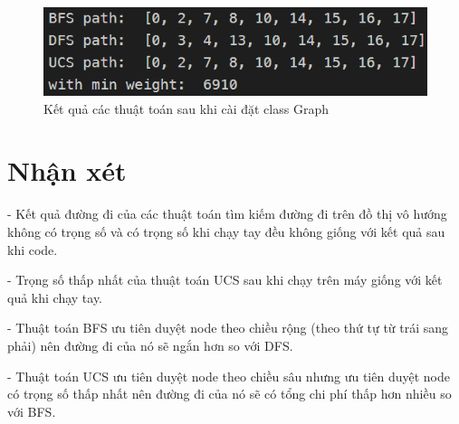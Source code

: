 \documentclass[a4paper, 11pt]{article}
\begin{document}
\begin{figure}[h]
    \centering
    \includegraphics[]{graph.png}
    \caption{Kết quả các thuật toán sau khi cài đặt class Graph}
\end{figure}

\section{Nhận xét}
- Kết quả đường đi của các thuật toán tìm kiếm đường đi trên đồ thị vô hướng không có trọng số và có trọng số khi chạy tay đều không giống với kết quả sau khi code.

- Trọng số thấp nhất của thuật toán UCS sau khi chạy trên máy giống với kết quả khi chạy tay.

- Thuật toán BFS ưu tiên duyệt node theo chiều rộng (theo thứ tự từ trái sang phải) nên đường đi của nó sẽ ngắn hơn so với DFS.

- Thuật toán UCS ưu tiên duyệt node theo chiều sâu nhưng ưu tiên duyệt node có trọng số thấp nhất nên đường đi của nó sẽ có tổng chi phí thấp hơn nhiều so với BFS.

\end{document}
